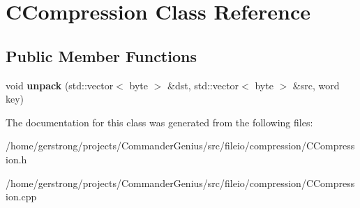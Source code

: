 \hypertarget{class_c_compression}{
\section{CCompression Class Reference}
\label{class_c_compression}
}
\subsection*{Public Member Functions}
\begin{DoxyCompactItemize}
\item 
\hypertarget{class_c_compression_a9c44e061c5363bbc848c451e997bba12}{
void {\bfseries unpack} (std::vector$<$ byte $>$ \&dst, std::vector$<$ byte $>$ \&src, word key)}
\label{class_c_compression_a9c44e061c5363bbc848c451e997bba12}

\end{DoxyCompactItemize}


The documentation for this class was generated from the following files:\begin{DoxyCompactItemize}
\item 
/home/gerstrong/projects/CommanderGenius/src/fileio/compression/CCompression.h\item 
/home/gerstrong/projects/CommanderGenius/src/fileio/compression/CCompression.cpp\end{DoxyCompactItemize}
